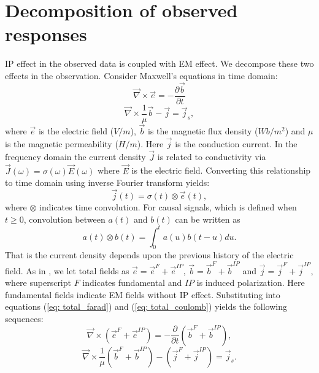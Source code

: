 \documentclass[a4paper, 11pt]{article}
\newcommand{\curl}{{\vec \nabla}\times}
\newcommand {\J}{{\vec J}}
\newcommand {\E}{{\vec E}}
\renewcommand {\j}  { {\vec j} }
\renewcommand {\b}  { {\vec b} }
\newcommand {\e}  { {\vec e} }
\begin{document}

\section{Decomposition of observed responses}
IP effect in the observed data is coupled with EM effect. We decompose these two effects in the observation. 
Consider Maxwell's equations in time domain:
\begin{equation}
  \curl{\e} = -\frac{\partial \b}{\partial t}
  \label{eq: total_farad}
\end{equation}
\begin{equation}
  \curl{\frac{1}{\mu}\b} - \j= \j_{s},
  \label{eq: total_coulomb}
\end{equation}
where $\e$ is the electric field ($V/m$), $\b$ is the magnetic flux density ($Wb/m^2$) and $\mu$ is the magnetic permeability ($H/m$). Here $\j$ is the conduction current. In the frequency domain the current density $\J$ is related to conductivity via $\J(\omega) = \sigma(\omega)\E(\omega)$ where $\E$ is the electric field.
Converting this relationship to time domain using inverse Fourier transform yields:
\begin{equation}
  \j(t) = \sigma(t)\otimes \e(t),
  \label{eq: ohmslaw1}
\end{equation}
where $\otimes$ indicates time convolution. 
For causal signals, which is defined when $t \ge 0$, convolution between $a(t)$ and $b(t)$ can be written as
\begin{equation}
  a(t) \otimes b(t) = \int_0^t a(u) b(t-u) du.
  \label{eq: convolution}
\end{equation}
That is the current density depends upon the previous history of the electric field.
As in \cite{Smith1988a}, we let total fields as $\e = \e^{F} + \e^{IP}$, $\b = \b^{F} + \b^{IP}$ and $\j = \j^{F} + \j^{IP}$, where superscript $F$ indicates fundamental and $IP$ is induced polarization. 
Here fundamental fields indicate EM fields without IP effect. 
Substituting into equations (\ref{eq: total_farad}) and (\ref{eq: total_coulomb}) yields the following sequences:
\begin{equation}
  \curl({\e^{F}+\e^{IP}}) = -\frac{\partial}{\partial t} (\b^{F}+\b^{IP}),
\end{equation}
\begin{equation}
  \curl\frac{1}{\mu}(\b^{F}+\b^{IP}) - (\j^{F}+\j^{IP})= \j_{s}.
\end{equation}
\end{document}
